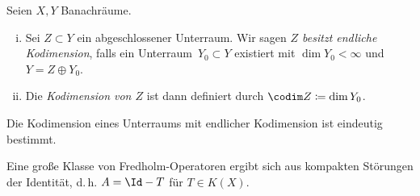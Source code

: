 \begin{thDef}[Kodimension] \label{vl20:def:codim}
    Seien $X,Y$ Banachräume.
    \begin{enumerate}[(i)]
        \item
            Sei $Z\subset Y$ ein abgeschlossener Unterraum. Wir sagen
            \emph{$Z$ besitzt endliche Kodimension}, falls ein
            Unterraum~$Y_0\subset Y$ existiert mit $\dim Y_0 < \infty$ 
            und $Y = Z \oplus Y_0$.
            
        \item
            Die \emph{Kodimension von $Z$} ist dann definiert durch
            $\codim Z \defeq \dim Y_0$.
    \end{enumerate}
\end{thDef}

\begin{thLemma}
    Die Kodimension eines Unterraums mit endlicher Kodimension ist eindeutig bestimmt.
\end{thLemma}


\nnBemerkung Eine große Klasse von Fredholm-Operatoren ergibt sich aus
kompakten Störungen der Identität, d.\,h. $A = \Id-T$ für $T\in K(X)$.
